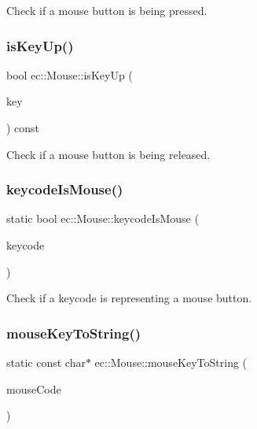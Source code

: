 Check if a mouse button is being pressed. 

\mbox{\label{classec_1_1_mouse_a0e7b2dc5f3b7b9ea2a348fa7a44fb629}} 
\subsubsection{\texorpdfstring{is\+Key\+Up()}{isKeyUp()}}
{\footnotesize\ttfamily bool ec\+::\+Mouse\+::is\+Key\+Up (\begin{DoxyParamCaption}\item[{\mbox{\hyperlink{classec_1_1_mouse_acabdd3509adc381e415c60b29554e2fb}{Mouse\+::\+E\+C\+\_\+\+K\+E\+Y\+\_\+\+M\+O\+U\+SE}}}]{key }\end{DoxyParamCaption}) const}



Check if a mouse button is being released. 

\mbox{\label{classec_1_1_mouse_a6c43132b82c3d730515c3f6c8cf9e142}} 
\subsubsection{\texorpdfstring{keycode\+Is\+Mouse()}{keycodeIsMouse()}}
{\footnotesize\ttfamily static bool ec\+::\+Mouse\+::keycode\+Is\+Mouse (\begin{DoxyParamCaption}\item[{int}]{keycode }\end{DoxyParamCaption})\hspace{0.3cm}{\ttfamily [static]}}



Check if a keycode is representing a mouse button. 

\mbox{\label{classec_1_1_mouse_a8ea44f894f0467851d1a12747f8a5e4b}} 
\subsubsection{\texorpdfstring{mouse\+Key\+To\+String()}{mouseKeyToString()}}
{\footnotesize\ttfamily static const char$\ast$ ec\+::\+Mouse\+::mouse\+Key\+To\+String (\begin{DoxyParamCaption}\item[{\mbox{\hyperlink{classec_1_1_mouse_acabdd3509adc381e415c60b29554e2fb}{E\+C\+\_\+\+K\+E\+Y\+\_\+\+M\+O\+U\+SE}}}]{mouse\+Code }\end{DoxyParamCaption})\hspace{0.3cm}{\ttfamily [static]}}



